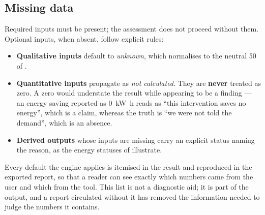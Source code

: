 \subsection{Missing data}
\label{sec:missing-data}

Required inputs must be present; the assessment does not proceed without them.
Optional inputs, when absent, follow explicit rules:

\begin{itemize}
  \item \textbf{Qualitative inputs} default to \emph{unknown}, which normalises
  to the neutral 50 of .
  \item \textbf{Quantitative inputs} propagate as \emph{not calculated}. They
  are \textbf{never} treated as zero. A zero would understate the result while
  appearing to be a finding --- an energy saving reported as
  \qty{0}{\kilo\watt\hour} reads as ``this intervention saves no energy'',
  which is a claim, whereas the truth is ``we were not told the demand'', which
  is an absence.
  \item \textbf{Derived outputs} whose inputs are missing carry an explicit
  status naming the reason, as the energy statuses of 
  illustrate.
\end{itemize}

Every default the engine applies is itemised in the result and reproduced in
the exported report, so that a reader can see exactly which numbers came from
the user and which from the tool. This list is not a diagnostic aid; it is part
of the output, and a report circulated without it has removed the information
needed to judge the numbers it contains.
